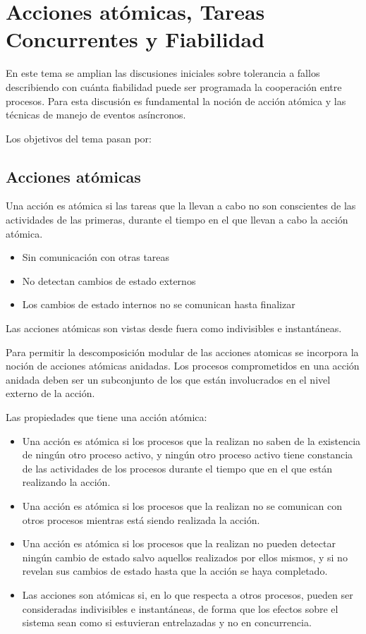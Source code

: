 \section{Acciones atómicas, Tareas Concurrentes y Fiabilidad}

En este tema se amplian las discusiones iniciales sobre tolerancia a fallos
describiendo con cuánta fiabilidad puede ser programada la cooperación entre
procesos. Para esta discusión es fundamental la noción de acción atómica y las
técnicas de manejo de eventos asíncronos.

Los objetivos del tema pasan por:

\subsection{Acciones atómicas}

Una acción es atómica si las tareas que la llevan a cabo no son conscientes de
las actividades de las primeras, durante el tiempo en el que llevan a cabo la
acción atómica.

\begin{itemize}
	\item Sin comunicación con otras tareas
	\item No detectan cambios de estado externos
	\item Los cambios de estado internos no se comunican hasta finalizar
\end{itemize}

Las acciones atómicas son vistas desde fuera como indivisibles e instantáneas.

Para permitir la descomposición modular de las acciones atomicas se incorpora la
noción de acciones atómicas anidadas. Los procesos comprometidos en una acción
anidada deben ser un subconjunto de los que están involucrados en el nivel
externo de la acción.

Las propiedades que tiene una acción atómica:

\begin{itemize}
	\item Una acción es atómica si los procesos que la realizan no saben de
		la existencia de ningún otro proceso activo, y ningún otro
		proceso activo tiene constancia de las actividades de los
		procesos durante el tiempo que en el que están realizando la
		acción.
	\item Una acción es atómica si los procesos que la realizan no se
		comunican con otros procesos mientras está siendo realizada la
		acción.
	\item Una acción es atómica si los procesos que la realizan no pueden
		detectar ningún cambio de estado salvo aquellos realizados por
		ellos mismos, y si no revelan sus cambios de estado hasta que la
		acción se haya completado.
	\item Las acciones son atómicas si, en lo que respecta a otros procesos,
		pueden ser consideradas indivisibles e instantáneas, de forma
		que los efectos sobre el sistema sean como si estuvieran
		entrelazadas y no en concurrencia.
\end{itemize}

